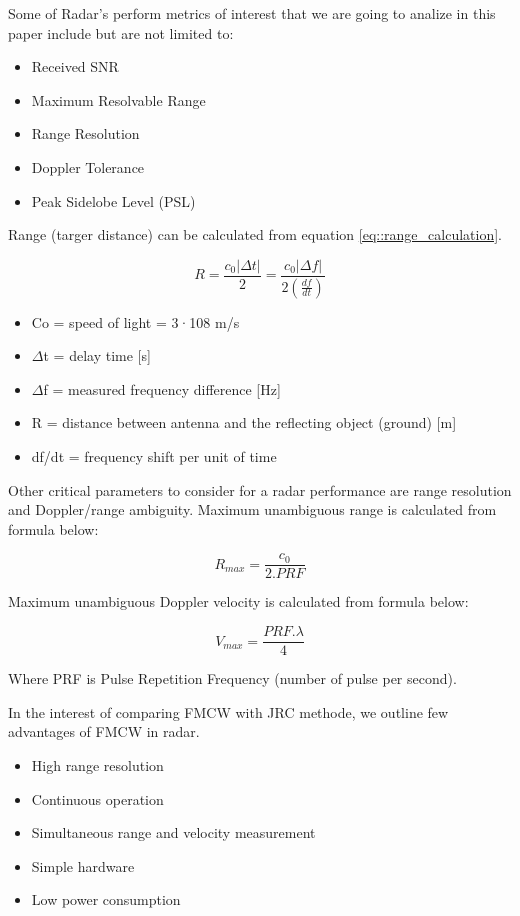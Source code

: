 \documentclass[conference]{IEEEtran}
\begin{document}
Some of Radar's perform metrics of interest that we are going to analize in this paper include but are not limited to:

\begin{itemize}
\item Received SNR
\item Maximum Resolvable Range
\item Range Resolution
\item Doppler Tolerance
\item Peak Sidelobe Level (PSL)
\end{itemize}

	Range (targer distance) can be calculated from equation \ref{eq::range_calculation}. %
	
	\begin{equation}
		R = \frac{c_0|{\Delta}t|}{2} = \frac{c_0|{\Delta}f|}{2\left(\frac{df}{dt}\right)}
		\label{eq::range_calculation}
	\end{equation}
	
	\begin{itemize}
	\item Co = speed of light = 3·108 m/s
	\item \(\Delta \)t = delay time [s]
	\item \(\Delta \)f = measured frequency difference [Hz]
	\item R = distance between antenna and the reflecting object (ground) [m]
	\item df/dt = frequency shift per unit of time
	\end{itemize}

Other critical parameters to consider for a radar performance are range resolution and Doppler/range ambiguity. 
Maximum unambiguous range is calculated from formula below:

	\begin{equation}
		R_{max} = \frac{c_0}{2.PRF}
		\label{eq:: range ambiguity_calculation}
	\end{equation}

Maximum unambiguous Doppler velocity is calculated from formula below:

\begin{equation}
		V_{max} = \frac{PRF.\lambda}{4}
		\label{eq:: Doppler ambiguity_calculation}
	\end{equation}
  
  Where PRF is Pulse Repetition Frequency (number of pulse per second).

In the interest of comparing FMCW with JRC methode, we outline few advantages of FMCW in radar.
	\begin{itemize}
		\item High range resolution
		\item Continuous operation
		\item Simultaneous range and velocity measurement
		\item Simple hardware
		\item Low power consumption
	\end{itemize}
	
\end{document}
